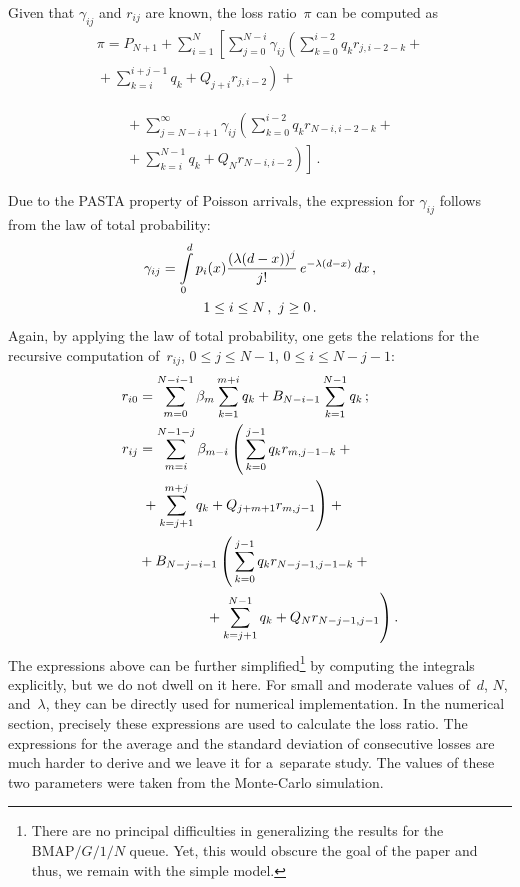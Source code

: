 \begin{multicols}{2}
Given that $\gamma_{ij}$ and $r_{ij}$ are known, the loss ratio~$\pi$  
can be computed as
\begin{multline*}
\pi =
P_{N+1}
 + 
\sum\limits_{i=1}^{N} \left [
\sum\limits_{j=0}^{N-i}
\gamma_{ij} \left ( \sum\limits_{k=0}^{i-2} q_k r_{j,i-2-k}
 +{}\right.\right.\\
\left. {}+ \sum\limits_{k=i}^{i+j-1} q_k  + Q_{j+i} r_{j,i-2} \right )
 + {}
\end{multline*}

\noindent
\begin{multline*}
{}+ \sum\limits_{j=N-i+1}^{\infty} \gamma_{ij} \left (
\sum\limits_{k=0}^{i-2} q_k r_{N-i,i-2-k}  + {}\right.\\
\left.\left.{}+\sum\limits_{k=i}^{N-1}
q_k  + Q_{N} r_{N-i,i-2} \right )
\right ]\,.
\end{multline*}

Due to the PASTA property of Poisson arrivals,
the expression for $\gamma_{ij}$ follows 
from the law of total probability:
\begin{multline*}
\gamma_{ij}
= \int\limits_0^d p_{i}(x) \displaystyle\frac{\displaystyle (\lambda (d- x))^j \mathstrut}{\displaystyle j!\mathstrut}\, e^{-\lambda (d-x)}\, dx\,,
\\
 1 \le i \le N\,, \ j \ge 0\,.
\end{multline*}
Again, by applying the law of total probability,
one gets the relations for the recursive computation of~$r_{ij}$, 
$0\le j \le N-1$, $0 \le i \le N-j-1$:
\begin{align*}
r_{i0}&= \sum\limits_{m=0}^{N-i-1}
\beta_m 
\sum\limits_{k=1}^{m+i} q_k +
B_{N-i-1} \sum\limits_{k=1}^{N-1} q_k\,;\\
r_{ij}&= \sum\limits_{m=i}^{N-1-j} \beta_{m-i} \left (
\vphantom{\sum\limits_{k=j+1}^{m+j} q_k + Q_{j+m+1} r_{m,j-1}}
\sum\limits_{k=0}^{j-1} q_k r_{m,j-1-k} +{}\right.\\
&\left.{}+
\sum\limits_{k=j+1}^{m+j} q_k + Q_{j+m+1} r_{m,j-1}
\right ) +{}
\\
&{}+ B_{N-j-i-1}
\left ( \vphantom{\sum\limits_{k=j+1}^{m+j} q_k + Q_{j+m+1} r_{m,j-1}}
\sum\limits_{k=0}^{j-1} q_k r_{N-j-1,j-1-k} +{}\right.\\
&\hspace*{16mm}\left.{}+\sum\limits_{k=j+1}^{N-1} q_k +Q_{N} r_{N-j-1,j-1}
\right ).
\end{align*}
The expressions above can be further simplified\footnote{There
are no principal difficulties in generalizing
the results for the $\mathrm{BMAP}/G/1/N$ queue.
Yet, this would obscure the goal of the paper and thus, 
we remain with the simple model.} by computing 
the integrals explicitly, but we do not dwell on it here.
For small and moderate values of~$d$, $N$, and~$\lambda$,
they can be directly used for numerical implementation.
In the numerical section, precisely these expressions are used to calculate
the loss ratio. The expressions for the average and the standard
deviation of consecutive losses are much harder to derive
and we leave it for a~separate study. The values of these 
two parameters were taken from the Monte-Carlo simulation. 


\end{multicols}
